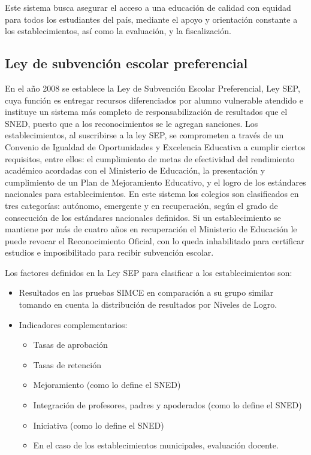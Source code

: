\begin{description}
Este sistema busca asegurar el acceso a una educación de calidad con equidad para todos los estudiantes del país, mediante el apoyo y orientación constante a los establecimientos, así como la evaluación, y la fiscalización. \cite{sac}

\subsection{Ley de subvención escolar preferencial}
En el año 2008 se establece la Ley de Subvención Escolar Preferencial, Ley SEP, cuya función es entregar recursos diferenciados por alumno vulnerable atendido e instituye un sistema más completo de responsabilización de resultados que el SNED, puesto que a los reconocimientos se le agregan sanciones. Los establecimientos, al suscribirse a la ley SEP, se comprometen a través de un Convenio de Igualdad de Oportunidades y Excelencia Educativa a cumplir ciertos requisitos, entre ellos: el cumplimiento de metas de efectividad del rendimiento académico acordadas con el Ministerio de Educación, la presentación y cumplimiento de un Plan de Mejoramiento Educativo, y el logro de los estándares nacionales para establecimientos. En este sistema los colegios son clasificados en tres categorías: autónomo, emergente y en recuperación, según el grado de consecución de los estándares nacionales definidos. Si un establecimiento se mantiene por más de cuatro años en recuperación el Ministerio de Educación le puede revocar el Reconocimiento Oficial, con lo queda inhabilitado para certificar estudios e imposibilitado para recibir subvención escolar.

Los factores definidos en la Ley SEP para clasificar a los establecimientos son:
\begin{itemize}
\item Resultados en las pruebas SIMCE en comparación a su grupo similar tomando en cuenta la distribución de resultados por Niveles de Logro.
\item Indicadores complementarios:
    \begin{itemize}
    \item Tasas de aprobación
    \item Tasas de retención
    \item Mejoramiento (como lo define el SNED)
    \item Integración de profesores, padres y apoderados (como lo define el SNED)
    \item Iniciativa (como lo define el SNED)
    \item En el caso de los establecimientos municipales, evaluación docente.
    \end{itemize}
\end{itemize}


\end{description}
